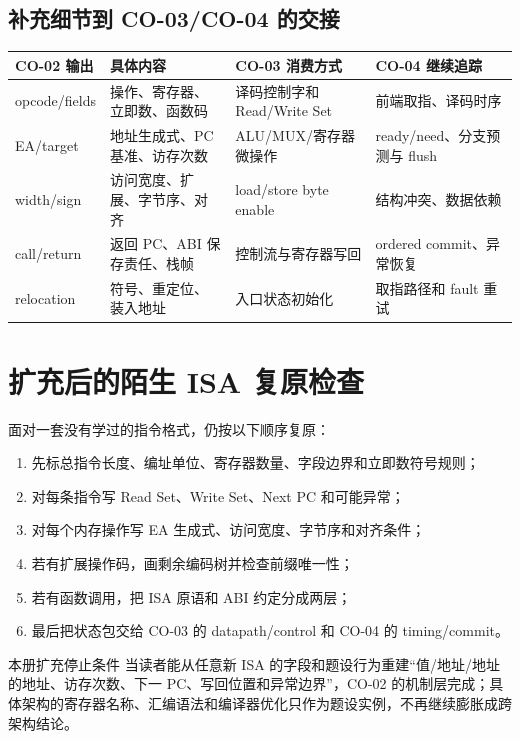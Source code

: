 \documentclass[UTF8,fontset=fandol,11pt,a4paper]{ctexart}
\begin{document}
\subsection{补充细节到 CO-03/CO-04 的交接}

\begin{center}\small
\begin{tabularx}{\linewidth}{L{2.7cm}L{3.0cm}L{3.0cm}Y}
\toprule
CO-02 输出 & 具体内容 & CO-03 消费方式 & CO-04 继续追踪 \\
\midrule
opcode/fields & 操作、寄存器、立即数、函数码 & 译码控制字和 Read/Write Set & 前端取指、译码时序 \\
EA/target & 地址生成式、PC 基准、访存次数 & ALU/MUX/寄存器微操作 & ready/need、分支预测与 flush \\
width/sign & 访问宽度、扩展、字节序、对齐 & load/store byte enable & 结构冲突、数据依赖 \\
call/return & 返回 PC、ABI 保存责任、栈帧 & 控制流与寄存器写回 & ordered commit、异常恢复 \\
relocation & 符号、重定位、装入地址 & 入口状态初始化 & 取指路径和 fault 重试 \\
\bottomrule
\end{tabularx}
\end{center}

\section{扩充后的陌生 ISA 复原检查}

面对一套没有学过的指令格式，仍按以下顺序复原：
\begin{enumerate}
  \item 先标总指令长度、编址单位、寄存器数量、字段边界和立即数符号规则；
  \item 对每条指令写 Read Set、Write Set、Next PC 和可能异常；
  \item 对每个内存操作写 EA 生成式、访问宽度、字节序和对齐条件；
  \item 若有扩展操作码，画剩余编码树并检查前缀唯一性；
  \item 若有函数调用，把 ISA 原语和 ABI 约定分成两层；
  \item 最后把状态包交给 CO-03 的 datapath/control 和 CO-04 的 timing/commit。
\end{enumerate}

\begin{methodbox}{本册扩充停止条件}
当读者能从任意新 ISA 的字段和题设行为重建“值/地址/地址的地址、访存次数、下一 PC、写回位置和异常边界”，CO-02 的机制层完成；具体架构的寄存器名称、汇编语法和编译器优化只作为题设实例，不再继续膨胀成跨架构结论。
\end{methodbox}
\end{document}
